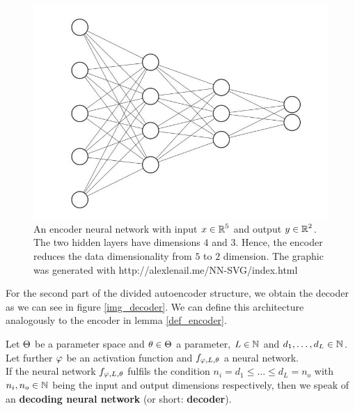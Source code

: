 \begin{figure}[H]
\begin{center}
   \begin{minipage}[b]{0.9\linewidth}
      \includegraphics[width=\linewidth]{encoder}
      \caption{An encoder neural network with input $x\in \operatorname{\mathbb{R}}^5$ and output $y \in \operatorname{\mathbb{R}}^2$. The two hidden layers have dimensions $4$ and $3$. Hence, the encoder reduces the data dimensionality from $5$ to $2$ dimension. The graphic was generated with http://alexlenail.me/NN-SVG/index.html}\label{img_encoder}
	\end{minipage}
\end{center}
\end{figure}


For the second part of the divided autoencoder structure, we obtain the decoder as we can see in figure \ref{img_decoder}. We can define this architecture analogously to the encoder in lemma \ref{def_encoder}.


\begin{lemma}\label{def_decoder}
Let $\operatorname{\Theta}$ be a parameter space and $\theta \in \operatorname{\Theta}$ a parameter, $L\in \operatorname{\mathbb{N}}$ and $d_1,\ldots, d_L\in\operatorname{\mathbb{N}}$. Let further $\operatorname{\varphi}$ be an activation function and $f_{\operatorname{\varphi},L,\theta}$ a neural network.\\
If the neural network $f_{\operatorname{\varphi},L,\theta}$ fulfils the condition $n_i= d_1 \leq \ldots \leq d_L = n_o$ with $n_i, n_o \in \operatorname{\mathbb{N}}$ being the input and output dimensions respectively, then we speak of an \textbf{decoding neural network} (or short: \textbf{decoder}).
\end{lemma}


